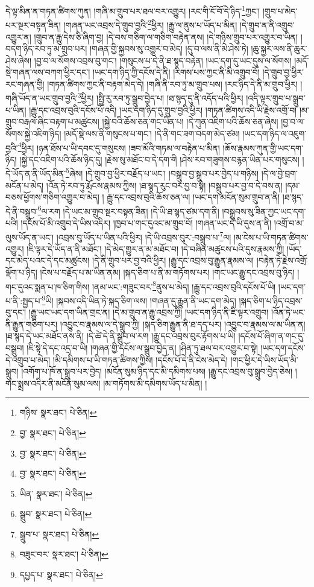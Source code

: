 དེ་ལྟ་མིན་ན་གཏན་ཚིགས་ཀུན། །གཞི་མ་གྲུབ་པར་ཐལ་བར་འགྱུར། །རང་གི་ངོ་བོ་དེ་ཉིད་\footnote{གཉིས་  སྣར་ཐང་།  པེ་ཅིན། }ཀྱང་། །གྲུབ་པ་མེད་པར་སྔར་བསྟན་ཟིན། །གཞན་ཡང་འབྲས་དེ་གྲུབ་བྱའི་\footnote{བྱ་  སྣར་ཐང་།  པེ་ཅིན། }ཕྱིར། །རྒྱུ་ལ་ནུས་པ་ཡོད་པ་མིན། །དེ་གྲུབ་ན་ནི་འགྲུབ་འགྱུར་ན། །གྲུབ་ན་རྒྱུ་དེས་ཅི་ཞིག་བྱ། །དེ་བས་གཅིག་ལ་གཅིག་བརྟེན་ནས། །དེ་གཉིས་གྲུབ་པར་འགྱུར་བ་ཡིན། །བདག་ཉིད་རབ་ཏུ་མ་གྲུབ་པར། །གཞན་གྱི་སྐྱབས་སུ་འགྱུར་བ་མེད། །དུ་བ་ལས་ནི་མེ་ཤེས་ཏེ། །ཆུ་སྐྱར་ལས་ནི་ཆུར་ཤེས་ཞེས། །བྱ་བ་ལ་སོགས་འབྲས་བུ་གང་། །གསུངས་པ་དེ་ནི་ཐ་སྙད་བརྟེན། །ཡང་དག་དུ་ཡང་དུས་ལ་སོགས། །མདོ་སྡེ་གཞན་ལས་བཀག་ཕྱིར་དང་། །ཡང་དག་ཉིད་ཀྱི་དངོས་དེ་ནི། །རིགས་པས་ཀྱང་ནི་མི་འགྲུབ་བོ། །དེ་གྲུབ་བྱ་ཕྱིར་རང་གཞན་གྱི། །གཏན་ཚིགས་ཀྱང་ནི་བརྟག་མེད་དེ། །གཞི་ནི་རབ་ཏུ་མ་གྲུབ་པས། །རང་ཉིད་དེ་ནི་མ་གྲུབ་ཕྱིར། །གཞི་ཡོད་ན་ཡང་གྲུབ་བྱའི་\footnote{བྱ་  སྣར་ཐང་།  པེ་ཅིན། }ཕྱིར། །སྤྱི་རུ་རབ་ཏུ་སྒྲུབ་བྱེད་པ། །ཐ་སྙད་དུ་ནི་འདོད་པའི་ཕྱིར། །འདི་ལྟར་གྲུབ་པ་སྒྲུབ་པ་ཡིན། །རྒྱུ་དང་འབྲས་བུའི་དངོས་པོ་འདི། །ཡང་དག་ཉིད་དུ་གྲུབ་བྱའི་ཕྱིར། །གཏན་ཚིགས་འདི་ཡི་རྗེས་འགྲོ་བ། །མ་གྲུབ་བརྒལ་ཞིང་བརྟག་པ་མཚུངས། །སྐྱེ་བའི་ཆོས་ཅན་གང་ཡིན་པ། །དེ་ཀུན་འཇིག་པའི་ཆོས་ཅན་ཞེས། །བྱ་བ་ལ་སོགས་སྐྱེ་འཇིག་ཉིད། །མདོ་སྡེ་ལས་ནི་གསུངས་པ་གང་། །དེ་ནི་གང་ཟག་བདག་མེད་ཙམ། །ཡང་དག་ཉིད་ལ་འཇུག་བྱའི་\footnote{བྱ་  སྣར་ཐང་།  པེ་ཅིན། }ཕྱིར། །ཉན་ཐོས་པ་ཡི་དབང་དུ་གསུངས། །ཟབ་མོའི་གཏམ་ལ་བརྟེན་པ་མིན། །ཆོས་རྣམས་ཀུན་གྱི་ཡང་དག་ཉིད། །སྐྱེ་དང་འཇིག་པའི་ཆོས་ཉིད་དུ། །རྗེས་སུ་མཐོང་བ་དེ་དག་གི །ཤེས་རབ་གཟུགས་བརྙན་ཡིན་པར་གསུངས། །དེ་ཡོད་ན་ནི་ཡོད་མིན་\footnote{ཡིན་  སྣར་ཐང་།  པེ་ཅིན། }ཞེས། །དེ་གྲུབ་བྱ་ཕྱིར་བརྗོད་པ་ཡང་། །བསྒྲུབ་བྱ་སྒྲུབ་པར་བྱེད་པ་གཉིས། །དེ་ལ་བྱེ་བྲག་མངོན་པ་མེད། །འོན་ཏེ་རབ་ཏུ་རྨོངས་རྣམས་ཀྱིས། །ཐ་སྙད་རུང་བར་བྱ་བ་སྟེ། །བསྒྲུབ་པར་བྱ་བ་དེ་བས་ན། །དམ་བཅས་ཕྱོགས་གཅིག་འགྱུར་བ་མེད། །
རྒྱུ་དང་འབྲས་བུའི་ཆོས་ཅན་ལ། །ཡང་དག་མངོན་སུམ་གྲུབ་ན་ནི། །ཐ་སྙད་དེ་ནི་བསྒྲུབ་\footnote{སྒྲུབ་  སྣར་ཐང་།  པེ་ཅིན། }ལ་རག །དེ་ཡང་མ་གྲུབ་སྔར་བསྟན་ཟིན། །དེ་ཡི་ཐ་སྙད་ཙམ་དག་ནི། །བསྒྲུབས་སུ་ཟིན་ཀྱང་ཡང་དག་པའི། །དངོས་པོ་མི་འགྲུབ་དེ་ཡིས་འདིར། །ཁྱབ་པ་གང་དུའང་མ་གྲུབ་བོ། །གཞན་ཡང་དེ་ཡི་དུས་ན་ནི། །འགྲོ་བ་མ་ལུས་ཡོད་ན་ཡང་། །འབྲས་བུ་ཡོད་པ་ཡིན་པའི་ཕྱིར། །དེ་ཡི་འབྲས་བུར་:བསྒྲུབ་པ་\footnote{སྒྲུབ་པ་  སྣར་ཐང་།  པེ་ཅིན། }ལ། །མ་ངེས་པ་ཡི་གཏན་ཚིགས་འགྱུར། །ཇི་ལྟར་དེ་ཡོད་ན་ནི་མཐོང་། །དེ་མེད་གྱུར་ན་མ་མཐོང་བ། །དེ་བཞིན་མཚུངས་པའི་དུས་རྣམས་ཀྱི། །ཡོད་དང་མེད་པའང་དེ་དང་མཚུངས། །དེ་ནི་གྲུབ་པར་བྱ་བའི་ཕྱིར། །རྒྱུ་དང་འབྲས་བུ་རྒྱུན་རྣམས་ལ། །བརྟེན་ཏེ་རྗེས་འགྲོ་ལྡོག་པ་ཉིད། །ངེས་པ་བརྗོད་པ་མ་ཡིན་ནམ། །སྐད་ཅིག་པ་ནི་མ་གཏོགས་པར། །གང་ཡང་རྒྱུ་དང་འབྲས་བུ་ཉིད། །གང་དུའང་སྨན་པ་ཁ་ཅིག་གིས། །ནམ་ཡང་:གཟུང་བར་\footnote{བཟུང་བར་  སྣར་ཐང་།  པེ་ཅིན། }ནུས་པ་མེད། །རྒྱུ་དང་འབྲས་བུའི་དངོས་པོ་ཡི། །ཡང་དག་པ་ནི་:སྤྱད་པ་\footnote{དཔྱད་པ་  སྣར་ཐང་།  པེ་ཅིན། }ཡི། །སྐབས་འདི་ཡིན་ཏེ་སྐད་ཅིག་ལས། །གཞན་དུ་རྒྱུན་ནི་ཡང་དག་མེད། །སྐད་ཅིག་པ་ཉིད་འབྲས་བུ་དང་། །རྒྱུ་ཡང་ཡང་དག་ཡིན་གྲང་ན། །དེ་མ་གྲུབ་ན་རྒྱུ་འབྲས་ཀྱི། །ཡང་དག་ཉིད་ནི་ཇི་ལྟར་འགྲུབ། །འོན་ཏེ་ཡང་ནི་རྒྱུན་གཅིག་པར། །འབྱུང་བ་རྣམས་ལ་དེ་སྒྲུབ་ཀྱི། །སྐད་ཅིག་རྒྱུན་ནི་ཐ་དད་པར། །འབྱུང་བ་རྣམས་ལ་མ་ཡིན་ན། །ཐ་སྙད་དེ་ཡང་མཐོང་ནས་ནི། །དེ་ཚེ་དེ་ནི་སྒྲུབ་ལ་རག །རྒྱུ་དང་འབྲས་བུར་རྟོགས་པ་ཡི། །དངོས་པོ་ཞིག་ན་གང་དུ་བསྒྲུབ། །ཇི་སྟེ་དེ་དང་འདྲ་བ་ཡི། །གཞན་གྱི་དངོས་ལ་སྒྲུབ་བྱེད་ན། །ཤིན་ཏུ་ཐལ་བར་འགྱུར་བ་སྟེ། །ཡང་དག་དངོས་དེ་འགྲུབ་པ་མེད། །མི་དམིགས་པ་ཡི་གཏན་ཚིགས་ཀྱིས། །དངོས་པོ་དེ་ནི་ངེས་མེད་དེ། །གང་ཕྱིར་དེ་ཡིས་ཡོད་མི་སྒྲུབ། །འགོག་པ་ཁོ་ན་སྒྲུབ་པར་བྱེད། །མངོན་སུམ་ཉིད་དང་མི་དམིགས་པས། །རྒྱུ་དང་འབྲས་བུ་སྒྲུབ་བྱེད་ཅེས། །གང་སྨྲས་འདིར་ནི་མངོན་སུམ་ལས། །མ་གཏོགས་མི་དམིགས་ཡོད་པ་མིན། །
